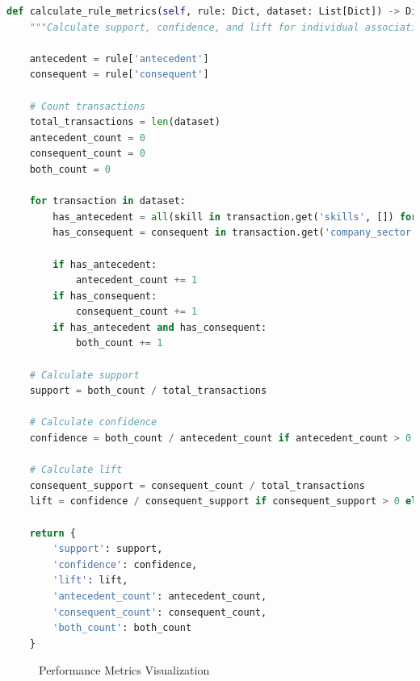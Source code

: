 \documentclass[12pt,a4paper]{article}
\begin{document}
\begin{lstlisting}[language=Python, caption=Performance Metrics Calculation Implementation]
def calculate_rule_metrics(self, rule: Dict, dataset: List[Dict]) -> Dict[str, float]:
    """Calculate support, confidence, and lift for individual association rules"""
    
    antecedent = rule['antecedent']
    consequent = rule['consequent']
    
    # Count transactions
    total_transactions = len(dataset)
    antecedent_count = 0
    consequent_count = 0
    both_count = 0
    
    for transaction in dataset:
        has_antecedent = all(skill in transaction.get('skills', []) for skill in antecedent)
        has_consequent = consequent in transaction.get('company_sector', '')
        
        if has_antecedent:
            antecedent_count += 1
        if has_consequent:
            consequent_count += 1
        if has_antecedent and has_consequent:
            both_count += 1
    
    # Calculate support
    support = both_count / total_transactions
    
    # Calculate confidence
    confidence = both_count / antecedent_count if antecedent_count > 0 else 0
    
    # Calculate lift
    consequent_support = consequent_count / total_transactions
    lift = confidence / consequent_support if consequent_support > 0 else 0
    
    return {
        'support': support,
        'confidence': confidence,
        'lift': lift,
        'antecedent_count': antecedent_count,
        'consequent_count': consequent_count,
        'both_count': both_count
    }
\end{lstlisting}

\begin{figure}[H]
\centering
{}
\caption{Performance Metrics Visualization}
\end{figure}
\end{document}

